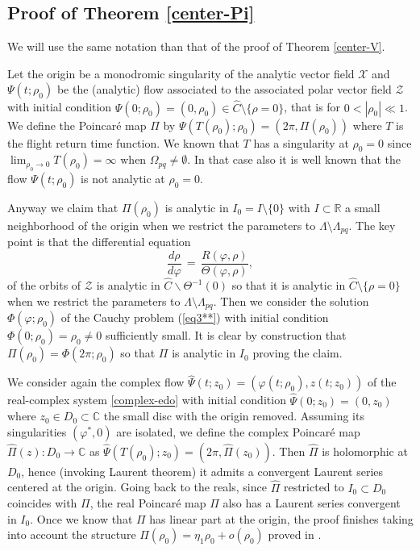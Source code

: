 \documentclass[12pt]{amsart}
\begin{document}
\subsection{Proof of Theorem \ref{center-Pi}}

We will use the same notation than that of the proof of Theorem \ref{center-V}.

Let the origin be a monodromic singularity of the analytic vector field $\mathcal{X}$ and $\Psi(t; \rho_0)$ be the (analytic) flow associated to the associated polar vector field $\mathcal{Z}$ with initial condition $\Psi(0; \rho_0) = (0, \rho_0) \in \hat{C} \setminus \{ \rho=0 \}$, that is for $0 < |\rho_0| \ll 1$. We define the Poincar\'e map $\Pi$ by $\Psi(T(\rho_0); \rho_0) = (2 \pi, \Pi(\rho_0))$ where $T$ is the flight return time function. We known that $T$ has a singularity at $\rho_0=0$ since  $\lim_{\rho_0 \to 0} T(\rho_0) = \infty$ when $\Omega_{pq} \neq \emptyset$. In that case also it is well known that the flow $\Psi(t; \rho_0)$ is not analytic at $\rho_0=0$.

Anyway we claim that $\Pi(\rho_0)$ is analytic in $I_0 = I \setminus \{0\}$ with $I \subset \mathbb{R}$ a small neighborhood of the origin when we restrict the parameters to $\Lambda \setminus \Lambda_{pq}$. The key point is that the differential equation
\begin{equation}\label{eq3**}
\frac{d \rho}{d \varphi} \, = \,  \frac{R(\varphi, \rho)}{\Theta(\varphi, \rho)},
\end{equation}
of the orbits of $\mathcal{Z}$ is analytic in $\hat{C} \backslash \Theta^{-1}(0)$ so that it is analytic in $\hat{C} \setminus \{ \rho=0 \}$ when we restrict the parameters to $\Lambda \setminus \Lambda_{pq}$. Then we consider the solution $\Phi(\varphi; \rho_0)$ of the Cauchy problem (\ref{eq3**}) with initial condition $\Phi(0; \rho_0) = \rho_0 \neq 0$ sufficiently small. It is clear by construction that $\Pi(\rho_0) = \Phi(2 \pi; \rho_0)$ so that $\Pi$ is analytic in $I_0$ proving the claim.

We consider again the complex flow $\hat\Psi(t; z_0) = (\varphi(t; \rho_0), z(t; z_0))$ of the real-complex system \eqref{complex-edo} with initial condition $\hat\Psi(0; z_0) = (0, z_0)$ where $z_0 \in D_0 \subset \mathbb{C}$ the small disc with the origin removed. Assuming its singularities $(\varphi^*, 0)$ are isolated, we define the complex Poincar\'e map $\hat{\Pi}(z) : D_0 \to \mathbb{C}$ as $\hat\Psi(T(\rho_0); z_0) = (2 \pi, \hat{\Pi}(z_0))$. Then $\hat{\Pi}$ is holomorphic at $D_0$, hence (invoking Laurent theorem) it admits a convergent Laurent series centered at the origin. Going back to the reals, since $\hat{\Pi}$ restricted to $I_0 \subset D_0$ coincides with $\Pi$, the real Poincar\'e map $\Pi$ also has a Laurent series convergent in $I_0$. Once we know that $\Pi$ has linear part at the origin, the proof finishes taking into account the structure $\Pi(\rho_0) = \eta_1 \rho_0 + o(\rho_0)$ proved in \cite{Ilyashenko}.
\end{document}
